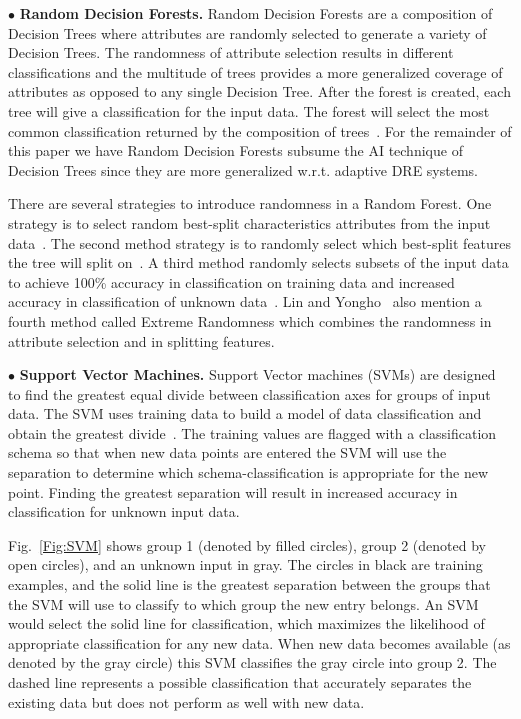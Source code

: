 \documentclass[conference]{IEEEtran}
\begin{document}
$\bullet$ {\bf Random Decision Forests.}
Random Decision Forests are a composition of Decision Trees where attributes are randomly selected to generate a variety of Decision Trees. The randomness of attribute selection results in different classifications and the multitude of trees provides a more generalized coverage of attributes as opposed to any single Decision Tree.
After the forest is created, each tree will give a classification for the input data. The forest will select the most common classification returned by the composition of trees~\cite{Lin:06}.  For the remainder of this paper we have Random Decision Forests subsume the AI technique of Decision Trees since they are more generalized w.r.t. adaptive DRE systems.

There are several strategies to introduce randomness in a Random Forest. One strategy is to select random best-split characteristics attributes from the input data~\cite{Breiman:01}. The second method strategy is to randomly select which best-split features the tree will split on~\cite{Dietterich:2000}. A third method randomly selects subsets of the input data to achieve 100\% accuracy in classification on training data and increased accuracy in classification of unknown data~\cite{Ho:98}.
Lin and Yongho~\cite{Lin:06} also mention a fourth method called Extreme Randomness which combines the randomness in attribute selection and in splitting features.

$\bullet$ {\bf Support Vector Machines.}
Support Vector machines (SVMs) are designed to find the greatest equal divide between classification axes for groups of input data. The SVM uses training data to build a model of data classification and obtain the greatest divide~\cite{Hoffert:10}. The training values are flagged with a classification schema so that when new data points are entered the SVM will use the separation to determine which schema-classification is appropriate for the new point. Finding the greatest separation will result in increased accuracy in classification for unknown input data.

	Fig.~\ref{Fig:SVM} shows group 1 (denoted by filled circles), group 2 (denoted by open circles), and an unknown input in gray. The circles in black are training examples, and the solid line is the greatest separation between the groups that the SVM will use to classify to which group the new entry belongs. An SVM would select the solid line for classification, which maximizes the likelihood of appropriate classification for any new data.
When new data becomes available (as denoted by the gray circle) this SVM
classifies the gray circle into group 2.
The dashed line represents a possible classification that accurately separates the existing data
but does not perform as well with new data.
\end{document}
